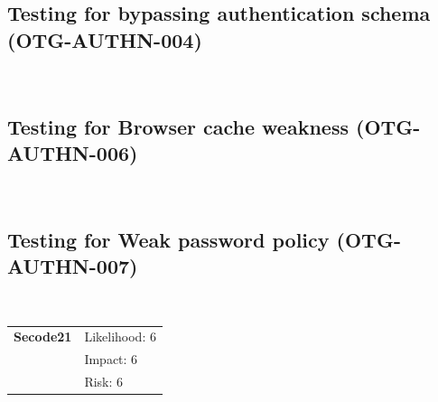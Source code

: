 \documentclass[headsepline,footsepline,footinclude=false,oneside,fontsize=11pt,paper=a4,listof=totoc,bibliography=totoc]{scrbook} %
\begin{document}
\pagebreak
\subsection{Testing for bypassing authentication schema (OTG-AUTHN-004)}\
 
\pagebreak
\subsection{Testing for Browser cache weakness (OTG-AUTHN-006)}\


\pagebreak
\subsection{Testing for Weak password policy (OTG-AUTHN-007)}\ 

\begin{tabular}{cR{12cm}}
	\textbf{Secode21} & Likelihood: 6\\& Impact: 6\\& Risk: 6
\end{tabular}
\end{document}
